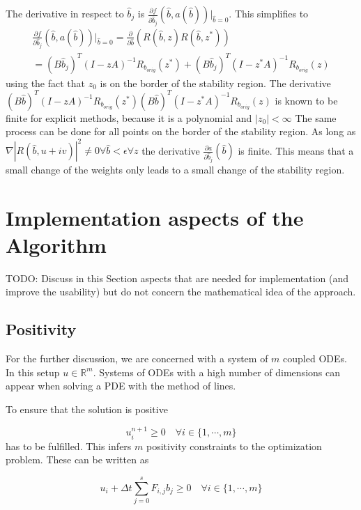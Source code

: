 \documentclass[a4paper]{article}
\numberwithin{equation}{section}
\theoremstyle{plain}
\theoremstyle{definition}
\numberwithin{theorem}{section}
\newcommand{\R}{\mathbb{R}}
\newcommand{\dt}{{\Delta t}}
\newcommand{\1}{\mathbbm{1}}
\begin{document}
The derivative in respect to $\hat{b}_j$ is 
$ \frac{\partial f}{\partial \hat{b}_j}(\hat{b},a(\hat{b})) \Big|_{\hat{b}=0}$.
This simplifies to 
\begin{multline}\label{eq:derivative_to_b}
 \frac{\partial f}{\partial \hat{b}_j}(\hat{b},a(\hat{b})) \Big|_{\hat{b}=0} = 
 \frac{\partial }{\partial \hat{b}}(R(\hat{b},z)R(\hat{b},z^*)) \\
 = (B\hat{b}_j)^T (I-zA)^{-1} R_{b_{orig}}(z^*) + (B\hat{b}_j)^T (I-z^*A)^{-1} R_{b_{orig}}(z)
\end{multline}
using the fact that $z_0$ is on the border of the stability region.
The derivative $(B\hat{b})^T (I-zA)^{-1} R_{b_{orig}}(z^*) (B\hat{b})^T (I-z^*A)^{-1} R_{b_{orig}}(z)$ is known to be finite for explicit methods, because it is a polynomial and $|z_0| < \infty$
The same process can be done for all points on the border of the stability region. 
As long as $\nabla|R(\hat{b},u+iv)|^2 \neq 0 \forall \hat{b} < \epsilon  \forall z$ the derivative $\frac{\partial a}{\partial \hat{b}_j} (\hat{b})$ is finite. This means that a small change of the weights only leads to a small change of the stability region.


\section{Implementation aspects of the Algorithm}\label{sec:imple}

TODO: Discuss in this Section aspects that are needed for implementation (and improve the usability) but do not concern the mathematical idea of the approach.

\subsection{Positivity}


For the further discussion, we are concerned with a system of $m$ coupled ODEs. 
In this setup $u \in \R^m$.
Systems of ODEs with a high number of dimensions can appear when solving a PDE with the method of lines.

To ensure that the solution is positive 

\begin{equation}
 u_i^{n+1} \geq 0   \quad   \forall {i \in \{1, \cdots,m \}}  
\end{equation}
has to be fulfilled.
This infers $m$ positivity constraints to the optimization problem. These can be written as

\begin{equation}
u_i + \dt \sum_{j=0}^s F_{i,j}  b_j \geq 0 \quad \forall {i \in \{1, \cdots,m \}}  
\end{equation}
\end{document}
